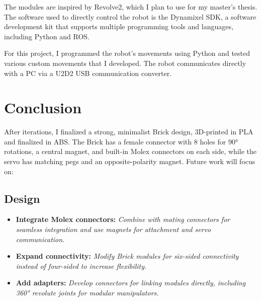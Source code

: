 \documentclass[12pt,a3paper]{article}
\begin{document}
{\begin{multicols}{2}
       The modules are inspired by Revolve2, which I plan to use for my master's thesis. The software used to directly control the robot is the Dynamixel SDK, a software development kit that supports multiple programming tools and languages, including Python and ROS. 

       \vspace{0.5em}
       
       For this project, I programmed the robot's movements using Python and tested various custom movements that I developed. The robot communicates directly with a PC via a U2D2 USB communication converter.
       
   \columnbreak
       \section{Conclusion}
       After iterations, I finalized a strong, minimalist Brick design, 3D-printed in PLA and finalized in ABS. The Brick has a female connector with 8 holes for 90° rotations, a central magnet, and built-in Molex connectors on each side, while the servo has matching pegs and an opposite-polarity magnet. Future work will focus on:

       \subsection*{Design}
       \begin{itemize}
       \setlength\itemsep{0.1em}
           \item \textbf{Integrate Molex connectors:} {\small \textit{Combine with mating connectors for seamless integration and use magnets for attachment and servo communication.}}
           \item \textbf{Expand connectivity:} {\small \textit{Modify Brick modules for six-sided connectivity instead of four-sided to increase flexibility.}}
           \item \textbf{Add adapters:} {\small \textit{Develop connectors for linking modules directly, including 360° revolute joints for modular manipulators.}}
       \end{itemize}


\end{multicols}}
\end{document}
